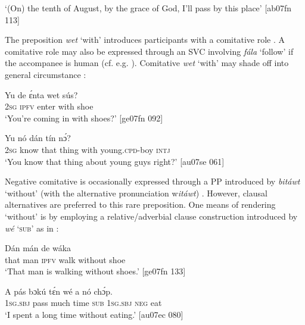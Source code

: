 \glt ‘(On) the tenth of August, by the grace of God, I’ll pass by this place’ [ab07fn 113]\index{}
\z

The preposition \textit{wet} ‘with’ introduces participants with a comitative role . A comitative role may also be expressed through an SVC involving \textit{fála} ‘follow’ if the accompanee is human (cf. e.g. ). Comitative \textit{wet} ‘with’ may shade off into general circumstance \index{}: 


\ea%
    \label{ex:key:1071}
    \gll Yu  de  ɛ́nta    wet    sús?\\
\textsc{2sg}  \textsc{ipfv}  enter  with    shoe\\

\glt ‘You’re coming in with shoes?’ [ge07fn 092]
\z


\ea%
    \label{ex:key:1072}
    \gll Yu  nó    dán  tín              nɔ́?\\
\textsc{2sg}  know  that  thing  with    young\textsc{.cpd}{}-boy  \textsc{intj}\\

\glt ‘You know that thing about young guys right?’ [au07se 061]
\z

Negative comitative is occasionally expressed through a PP introduced by \textit{bitáwt} ‘without’ (with the alternative pronunciation w\textit{itáwt}) . However, clausal alternatives are preferred to this rare preposition. One means of rendering ‘without’ is by employing a relative/adverbial clause construction introduced by \textit{wé} ‘\textsc{sub}’ as in : 


\ea%
    \label{ex:key:1073}
    \gll Dán  mán    de  wáka    \\
that  man    \textsc{ipfv}  walk  without  shoe\\

\glt ‘That man is walking without shoes.’ [ge07fn 133]
\z


\ea%
    \label{ex:key:1074}
    \gll A    pás    bɔkú  tɛ́n    wé  a    nó  chɔ́p.\\
\textsc{1sg.sbj}  pass    much  time    \textsc{sub}  \textsc{1sg.sbj}  \textsc{neg}  eat\\

\glt ‘I spent a long time without eating.’ [au07ec 080]\index{}
\z

